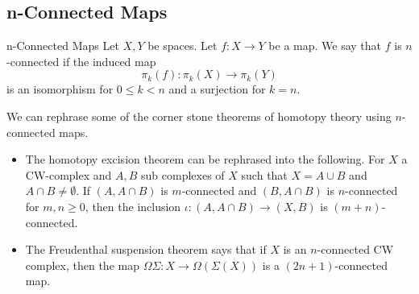 \documentclass[a4paper]{article}
\begin{document}
\subsection{n-Connected Maps}
\begin{defn}{n-Connected Maps}{} Let $X,Y$ be spaces. Let $f:X\to Y$ be a map. We say that $f$ is $n$-connected if the induced map $$\pi_k(f):\pi_k(X)\to\pi_k(Y)$$ is an isomorphism for $0\leq k<n$ and a surjection for $k=n$. 
\end{defn}

We can rephrase some of the corner stone theorems of homotopy theory using $n$-connected maps. 
\begin{itemize}
\item The homotopy excision theorem can be rephrased into the following. For $X$ a CW-complex and $A,B$ sub complexes of $X$ such that $X=A\cup B$ and $A\cap B\neq\emptyset$. If $(A,A\cap B)$ is $m$-connected and $(B,A\cap B)$ is $n$-connected for $m,n\geq 0$, then the inclusion $\iota:(A,A\cap B)\to(X,B)$ is $(m+n)$-connected. 
\item The Freudenthal suspension theorem says that if $X$ is an $n$-connected CW complex, then the map $\Omega\Sigma:X\to\Omega(\Sigma(X))$ is a $(2n+1)$-connected map. 
\end{itemize}
\end{document}

